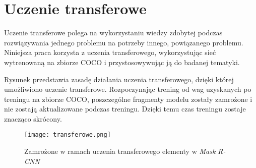 \newpage
\section{Uczenie transferowe}
\label{sec:uczenie-transferowe}

Uczenie transferowe polega na wykorzystaniu wiedzy zdobytej podczas rozwiązywania jednego problemu na potrzeby innego, powiązanego problemu.
Niniejsza praca korzysta z uczenia transferowego, wykorzystując sieć wytrenowaną na zbiorze COCO \cite{coco} i przystosowywując ją do badanej tematyki.

Rysunek  przedstawia zasadę działania uczenia transferowego, dzięki której umożliwiono uczenie transferowe. Rozpoczynając trening od wag uzyskanych po treningu na zbiorze COCO, poszczególne fragmenty modelu zostały zamrożone i nie zostają aktualizowane podczas treningu. Dzięki temu czas treningu zostaje znacząco skrócony.

\begin{figure}[h]
  \centering
  \caption{Zamrożone w ramach uczenia transferowego elementy w \textit{Mask R-CNN}}
  \texttt{[image: transferowe.png]}
  \label{fig:transferowe}
\end{figure}
